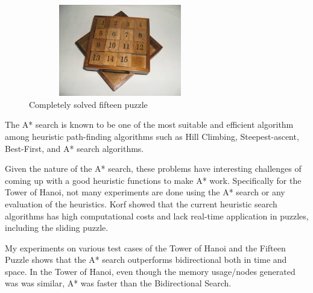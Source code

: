 \documentclass[conference]{IEEEtran}
\begin{document}
\begin{figure}[!t]
\includegraphics[width=8cm, height=4cm]{slidingpuzzle}
\centering
\caption{Completely solved fifteen puzzle}
\end{figure}

The A* search is known to be one of the most suitable and efficient algorithm among heuristic path-finding algorithms such as Hill Climbing, Steepest-ascent, Best-First, and A* search algorithms. \cite{Potdar}

Given the nature of the A* search, these problems have interesting challenges of coming up with a good heuristic functions to make A* work. Specifically for the Tower of Hanoi, not many experiments are done using the A* search or any evaluation of the heuristics. Korf showed that the current heuristic search algorithms has high computational costs and lack real-time application in puzzles, including the sliding puzzle. \cite{Korf}

My experiments on various test cases of the Tower of Hanoi and the Fifteen Puzzle shows that the A* search outperforms bidirectional both in time and space. In the Tower of Hanoi, even though the memory usage/nodes generated was was similar, A* was faster than the Bidirectional Search.





%
%
\end{document}
